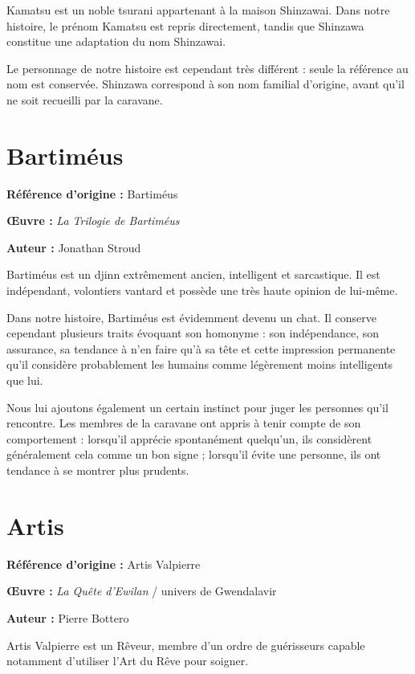 Kamatsu est un noble tsurani appartenant à la maison Shinzawai. Dans notre
histoire, le prénom Kamatsu est repris directement, tandis que Shinzawa
constitue une adaptation du nom Shinzawai.

Le personnage de notre histoire est cependant très différent : seule la
référence au nom est conservée. Shinzawa correspond à son nom familial
d'origine, avant qu'il ne soit recueilli par la caravane.

\section*{Bartiméus}

\textbf{Référence d'origine :} Bartiméus

\textbf{Œuvre :} \textit{La Trilogie de Bartiméus}

\textbf{Auteur :} Jonathan Stroud

Bartiméus est un djinn extrêmement ancien, intelligent et sarcastique. Il est
indépendant, volontiers vantard et possède une très haute opinion de lui-même.

Dans notre histoire, Bartiméus est évidemment devenu un chat. Il conserve
cependant plusieurs traits évoquant son homonyme : son indépendance, son
assurance, sa tendance à n'en faire qu'à sa tête et cette impression
permanente qu'il considère probablement les humains comme légèrement moins
intelligents que lui.

Nous lui ajoutons également un certain instinct pour juger les personnes qu'il
rencontre. Les membres de la caravane ont appris à tenir compte de son
comportement : lorsqu'il apprécie spontanément quelqu'un, ils considèrent
généralement cela comme un bon signe ; lorsqu'il évite une personne, ils ont
tendance à se montrer plus prudents.

\section*{Artis}

\textbf{Référence d'origine :} Artis Valpierre

\textbf{Œuvre :} \textit{La Quête d'Ewilan} / univers de Gwendalavir

\textbf{Auteur :} Pierre Bottero

Artis Valpierre est un Rêveur, membre d'un ordre de guérisseurs capable
notamment d'utiliser l'Art du Rêve pour soigner.

